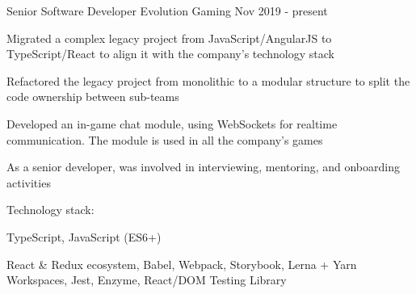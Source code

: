 

\begin{cventries}


  \cventry
    {Senior Software Developer} %
    {Evolution Gaming} %
    {} %
    {Nov 2019 - present} %
    {
      \begin{cvitems}
        \item Migrated a complex legacy project from JavaScript/AngularJS to TypeScript/React to align it with the company's technology stack
        \item Refactored the legacy project from monolithic to a modular structure to split the code ownership between sub-teams
        \item Developed an in-game chat module, using WebSockets for realtime communication. The module is used in all the company's games
        \item As a senior developer, was involved in interviewing, mentoring, and onboarding activities
      \end{cvitems}
      \vspace{5mm}
      Technology stack:
      \begin{cvstackitems}
        \item TypeScript, JavaScript (ES6+)
        \item React \& Redux ecosystem, Babel, Webpack, Storybook, Lerna + Yarn Workspaces, Jest, Enzyme, React/DOM Testing Library
      \end{cvstackitems}
      \vspace{-4.0mm}
    }


\end{cventries}

